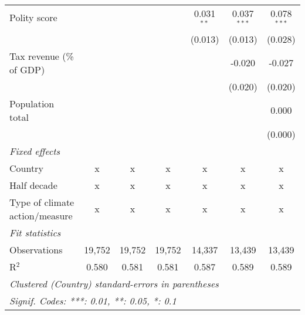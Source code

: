 \begin{tabular}{lcccccc}
   Polity score                                                     &         &                &                & 0.031$^{**}$   & 0.037$^{***}$  & 0.078$^{***}$\\   
                                                                    &         &                &                & (0.013)        & (0.013)        & (0.028)\\   
   Tax revenue (\% of GDP)                                          &         &                &                &                & -0.020         & -0.027\\   
                                                                    &         &                &                &                & (0.020)        & (0.020)\\   
   Population total                                                 &         &                &                &                &                & 0.000\\   
                                                                    &         &                &                &                &                & (0.000)\\   
   \emph{Fixed effects}\\
   Country                                                          & x       & x              & x              & x              & x              & x\\  
   Half decade                                                      & x       & x              & x              & x              & x              & x\\  
   Type of climate action/measure                                   & x       & x              & x              & x              & x              & x\\  
   \midrule \emph{Fit statistics}\\
   Observations                                                     & 19,752  & 19,752         & 19,752         & 14,337         & 13,439         & 13,439\\  
   R$^2$                                                            & 0.580   & 0.581          & 0.581          & 0.587          & 0.589          & 0.589\\  
   \midrule
   \multicolumn{7}{l}{\emph{Clustered (Country) standard-errors in parentheses}}\\
   \multicolumn{7}{l}{\emph{Signif. Codes: ***: 0.01, **: 0.05, *: 0.1}}\\
\end{tabular}
\par\endgroup



